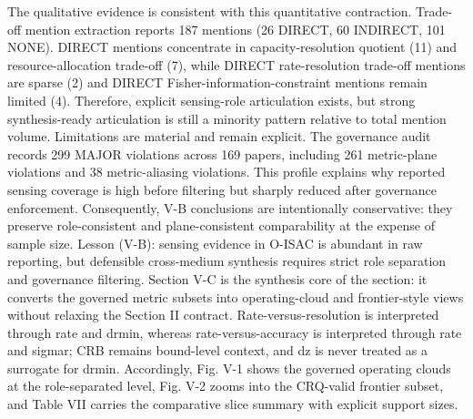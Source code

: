 {}The qualitative evidence is consistent with this quantitative contraction. Trade-off mention extraction reports 187 mentions (26 DIRECT, 60 INDIRECT, 101 NONE). DIRECT mentions concentrate in capacity-resolution quotient (11) and resource-allocation trade-off (7), while DIRECT rate-resolution trade-off mentions are sparse (2) and DIRECT Fisher-information-constraint mentions remain limited (4). Therefore, explicit sensing-role articulation exists, but strong synthesis-ready articulation is still a minority pattern relative to total mention volume.\markdownRendererParagraphSeparator
{}Limitations are material and remain explicit. The governance audit records 299 MAJOR violations across 169 papers, including 261 metric-plane violations and 38 metric-aliasing violations. This profile explains why reported sensing coverage is high before filtering but sharply reduced after governance enforcement. Consequently, V-B conclusions are intentionally conservative: they preserve role-consistent and plane-consistent comparability at the expense of sample size.\markdownRendererParagraphSeparator
{}Lesson (V-B): sensing evidence in O-ISAC is abundant in raw reporting, but defensible cross-medium synthesis requires strict role separation and governance filtering.\markdownRendererInterblockSeparator
{}
\markdownRendererSectionEnd 
\markdownRendererSectionEnd \markdownRendererSectionBegin
{}\markdownRendererInterblockSeparator
{}Section V-C is the synthesis core of the section: it converts the governed metric subsets into operating-cloud and frontier-style views without relaxing the Section II contract. Rate-versus-resolution is interpreted through rate and drmin, whereas rate-versus-accuracy is interpreted through rate and sigma\markdownRendererUnderscore{}r; CRB remains bound-level context, and dz is never treated as a surrogate for drmin. Accordingly, Fig. V-1 shows the governed operating clouds at the role-separated level, Fig. V-2 zooms into the CRQ-valid frontier subset, and Table VII carries the comparative slice summary with explicit support sizes.\markdownRendererParagraphSeparator
{}\markdownRendererParagraphSeparator

